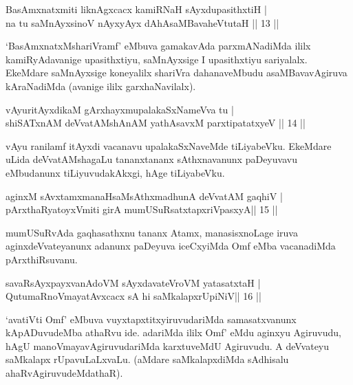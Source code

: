 \begin{shl}
BasAmxnatxmiti liknAgxcacx kamiRNaH sAyxdupasithxtiH  | \\
na tu saMnAyxsinoV nAyxyAyx dAhAsaMBavaheVtutaH \hfill||  13 || 
\end{shl}

\begin{artha} 
`BasAmxnatxMshariVramf' eMbuva gamakavAda parxmANadiMda ililx 
kamiRyAdavanige upasithxtiyu, saMnAyxsige I upasithxtiyu sariyalalx. 
EkeMdare saMnAyxsige koneyalilx shariVra dahanaveMbudu 
asaMBavavAgiruva kAraNadiMda (avanige ililx garxhaNavilalx).
\end{artha}

\begin{shl}
vAyuritAyxdikaM gArxhayxmupalakaSxNameVva tu  | \\
shiSATxnAM deVvatAMshAnAM yathAsavxM parxtipatatxyeV \hfill||  14 || 
\end{shl}

\begin{artha} 
vAyu ranilamf itAyxdi vacanavu upalakaSxNaveMde tiLiyabeVku. EkeMdare 
uLida deVvatAMshagaLu tananxtananx sAthxnavanunx paDeyuvavu eMbudanunx 
tiLiyuvudakAkxgi, hAge tiLiyabeVku.
\end{artha}


\begin{shl}
aginxM sAvxtamxmanaHsaMsAthxmadhunA deVvatAM gaqhiV | \\
pArxthaRyatoyxVmiti girA mumUSuRsatxtapxriVpasxyA\hfill ||  15 || 
\end{shl}

\begin{artha} 
mumUSuRvAda gaqhasathxnu tananx Atamx, manasisxnoLage iruva 
aginxdeVvateyanunx adanunx paDeyuva iceCxyiMda Omf eMba vacanadiMda 
pArxthiRsuvanu.
\end{artha}


\begin{shl}
savaRsAyxpayxvanAdoVM sAyxdavateVroVM yatasatxtaH | \\
QutumaRnoVmayatAvxcacx sA hi saMkalapxrUpiNiV\hfill ||  16 || 
\end{shl}

\begin{artha} 
`avatiVti Omf' eMbuva vuyxtapxtitxyiruvudariMda samasatxvanunx 
kApADuvudeMba athaRvu ide. adariMda ililx Omf' eMdu aginxyu Agiruvudu, 
hAgU manoVmayavAgiruvudariMda karxtuveMdU Agiruvudu. A deVvateyu 
saMkalapx rUpavuLaLxvaLu. (aMdare saMkalapxdiMda sAdhisalu 
ahaRvAgiruvudeMdathaR).
\end{artha}

